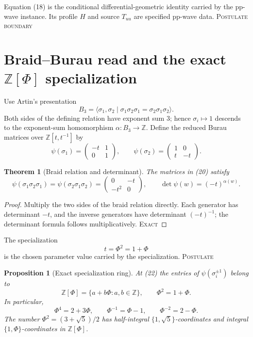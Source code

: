 \documentclass[10pt]{article}
\newtheorem{theorem}[definition]{Theorem}
\newtheorem{proposition}[definition]{Proposition}
\theoremstyle{remark}
\newcommand{\Z}{\mathbb Z}
\newcommand{\cstatus}[1]{\hfill\textsc{#1}}
\newcommand{\exact}{\textsc{Exact}}
\newcommand{\postulate}{\textsc{Postulate}}
\begin{document}
Equation (18) is the conditional differential-geometric identity carried by
the pp-wave instance.  Its profile $H$ and source $T_{uu}$ are specified
pp-wave data. \cstatus{Postulate boundary}

\section{Braid--Burau read and the exact \texorpdfstring{$\mathbb Z[\Phi]$}{Z[Phi]} specialization}

Use Artin's presentation
\[
 B_3=\langle\sigma_1,\sigma_2\mid
 \sigma_1\sigma_2\sigma_1=\sigma_2\sigma_1\sigma_2\rangle.
\]
Both sides of the defining relation have exponent sum $3$; hence
$\sigma_i\mapsto1$ descends to the exponent-sum homomorphism
$\alpha:B_3\to\Z$.  Define the reduced Burau matrices over
$\Z[t,t^{-1}]$ by \cite{artin1925,burau1935}
\[
 \psi(\sigma_1)=\begin{pmatrix}-t&1\\0&1\end{pmatrix},\qquad
 \psi(\sigma_2)=\begin{pmatrix}1&0\\t&-t\end{pmatrix}.
\tag{20}
\]

\begin{theorem}[Braid relation and determinant]\label{thm:burau}
The matrices in (20) satisfy
\[
 \psi(\sigma_1\sigma_2\sigma_1)
=\psi(\sigma_2\sigma_1\sigma_2)
=\begin{pmatrix}0&-t\\-t^2&0\end{pmatrix},
\qquad
 \det\psi(w)=(-t)^{\alpha(w)}.
\tag{21}
\]
\end{theorem}

\begin{proof}
Multiply the two sides of the braid relation directly.  Each generator has
determinant $-t$, and the inverse generators have determinant $(-t)^{-1}$;
the determinant formula follows multiplicatively. \cstatus{\exact}
\end{proof}

The specialization
\[
 t=\Phi^2=1+\Phi
\tag{22}
\]
is the chosen parameter value carried by the specialization.
\cstatus{\postulate}

\begin{proposition}[Exact specialization ring]\label{prop:ring}
At (22) the entries of $\psi(\sigma_i^{\pm1})$ belong to
\[
 \Z[\Phi]=\{a+b\Phi:a,b\in\Z\},\qquad \Phi^2=1+\Phi.
\tag{23}
\]
In particular,
\[
 \Phi^4=2+3\Phi,\qquad \Phi^{-1}=\Phi-1,\qquad
 \Phi^{-2}=2-\Phi.
\tag{24}
\]
The number $\Phi^2=(3+\sqrt5)/2$ has half-integral
$\{1,\sqrt5\}$-coordinates and integral $\{1,\Phi\}$-coordinates in
$\Z[\Phi]$.
\end{proposition}
\end{document}
